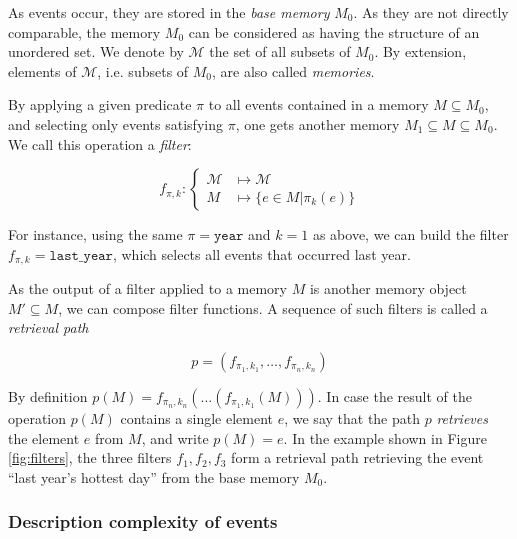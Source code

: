 \documentclass[entropy,article,submit,moreauthors,pdftex]{Definitions/mdpi}
\begin{document}
As events occur, they are stored in the  \emph{base memory} $M_0$. As they are not directly comparable, the memory $M_0$ can be considered as having the structure of an unordered set. We denote by $\mathcal{M}$ the set of all subsets of $M_0$. By extension, elements of $\mathcal{M}$, i.e. subsets of $M_0$, are also called \emph{memories}.

By applying a given predicate $\pi$ to all events contained in a memory $M \subseteq M_0$, and selecting only events satisfying $\pi$, one gets another memory $M_1 \subseteq M \subseteq M_0$. We call this operation a \emph{filter}:

\begin{equation}
    \label{eq:filter}
    f_{\pi, k}: \begin{cases}
        \mathcal{M} & \mapsto \mathcal{M}           \\
        M           & \mapsto \{e \in M | \pi_k(e) \}
    \end{cases}
\end{equation}

For instance, using the same $\pi = \mathtt{year}$ and $k=1$ as above, we can
build the filter $f_{\pi, k} = \mathtt{last\_{}year}$, which selects all events
that occurred last year.

As the output of a filter applied to a memory $M$ is another memory
object $M' \subseteq M$, we can compose filter
functions. A sequence of such filters is called a \emph{retrieval path}

\begin{equation}
    \label{eq:ret_def}
    p = (f_{\pi_{1}, k_{1}}, \dots, f_{\pi_{n}, k_{n}})
\end{equation}

By definition
$p(M) = f_{\pi_{n}, k_{n}}(\dots(f_{\pi_{1}, k_{1}}(M)))$.
In case the result of the operation $p(M)$ contains a single element
$e$, we say that the path $p$ \emph{retrieves} the element $e$ from $M$, and write
$p(M) = e$. In the example shown in Figure \ref{fig:filters}, the three filters $f_1, f_2, f_3$ form a retrieval path retrieving the event ``last year's hottest day'' from the base memory $M_0$.

\subsubsection{Description complexity of events}
\end{document}
